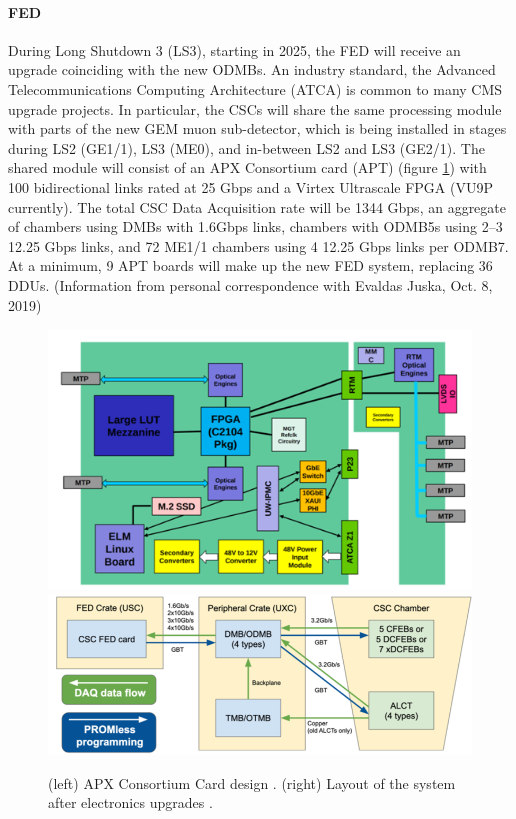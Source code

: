 \documentclass[a4paper,11pt]{article}
\begin{document}
\paragraph{FED}
During Long Shutdown 3 (LS3), starting in 2025, the FED will receive an upgrade coinciding with the new ODMBs. An industry standard, the Advanced Telecommunications Computing Architecture (ATCA) is common to many CMS upgrade projects. In particular, the CSCs will share the same processing module with parts of the new GEM muon sub-detector, which is being installed in stages during LS2 (GE1/1), LS3 (ME0), and in-between LS2 and LS3 (GE2/1). The shared module will consist of an APX Consortium card (APT) (figure \ref{fig:FED}) with 100 bidirectional links rated at 25 Gbps and a Virtex Ultrascale FPGA (VU9P currently). The total CSC Data Acquisition rate will be 1344 Gbps, an aggregate of chambers using DMBs with 1.6Gbps links, chambers with ODMB5s using 2--3 12.25 Gbps links, and 72 ME1/1 chambers using 4 12.25 Gbps links per ODMB7. At a minimum, 9 APT boards will make up the new FED system, replacing 36 DDUs. (Information from personal correspondence with Evaldas Juska, Oct. 8, 2019)
\begin{figure}[htbp]
\centering %
\includegraphics[width=.35\textwidth]{APTX.png}
\qquad
\includegraphics[width=.45\textwidth]{FED.png}
\caption{\label{fig:FED} (left) APX Consortium Card design \cite{fed}. (right) Layout of the system after electronics upgrades \cite{fed}.}
\end{figure}

\end{document}
